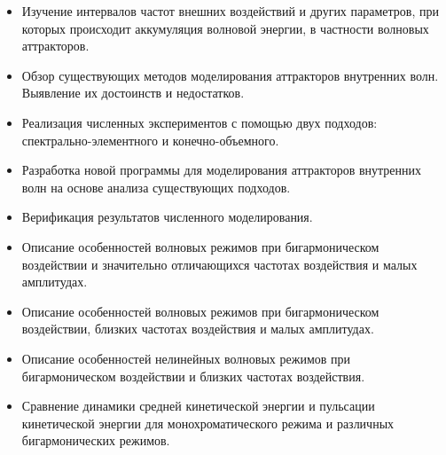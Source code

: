 \documentclass[utf8x]{G7-32} %
\begin{document}
\begin{itemize}

  \item Изучение интервалов частот внешних воздействий и других параметров, при которых происходит аккумуляция волновой энергии, в частности волновых аттракторов.

    
  \item Обзор существующих методов моделирования аттракторов внутренних волн. Выявление их достоинств и недостатков.
    
  \item Реализация численных экспериментов с помощью двух подходов: спектрально-элементного и конечно-объемного.

  \item Разработка новой программы для моделирования аттракторов внутренних волн на основе анализа существующих подходов.
    
  \item Верификация результатов численного моделирования.

  \item Описание особенностей волновых режимов при бигармоническом воздействии и значительно отличающихся частотах воздействия и малых амплитудах.

  \item Описание особенностей волновых режимов при бигармоническом воздействии, близких частотах воздействия и малых амплитудах.
    
  \item Описание особенностей нелинейных волновых режимов при бигармоническом воздействии и близких частотах воздействия.

  \item Сравнение динамики средней кинетической энергии и пульсации кинетической энергии для монохроматического режима и различных бигармонических режимов.
    
    
    
    
\end{itemize}
\end{document}
